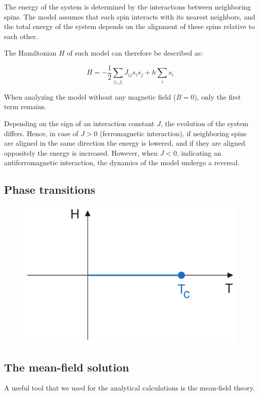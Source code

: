 \documentclass[11pt,a4paper]{article}
\begin{document}
The energy of the system is determined by the interactions between neighboring spins. The model assumes that each spin interacts with its nearest neighbors, and the total energy of the system depends on the alignment of these spins relative to each other.

The Hamiltonian $H$ of such model can therefore be described as:

\begin{equation}
    H = -\frac12\sum_{\langle i,j \rangle} J_{ij} s_i s_j + h\sum_i s_i
\end{equation}

When analyzing the model without any magnetic field ($B=0$), only the first term remains.

Depending on the sign of an interaction constant $J$, the evolution of the system differs. Hence, in case of $J>0$ (ferromagnetic interaction), if neighboring spins are aligned in the same direction the energy is lowered, and if they are aligned oppositely the energy is increased. However, when $J<0$, indicating an antiferromagnetic interaction, the dynamics of the model undergo a reversal.


\subsection{Phase transitions}

\begin{figure}[ht!]
    \centering
    \includegraphics[width=0.7\linewidth]{../figures/phase-diagram.pdf}
\end{figure}


\subsection{The mean-field solution}

A useful tool that we used for the analytical calculations is the mean-field theory. 
\end{document}
